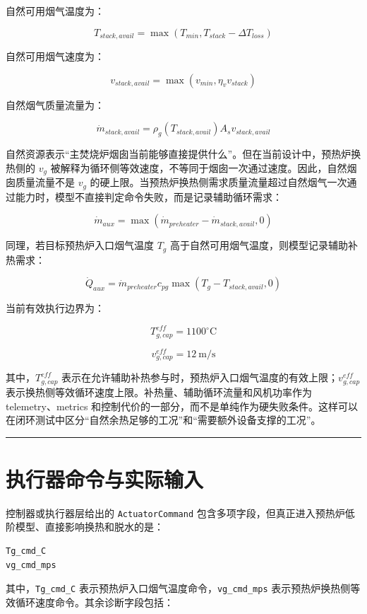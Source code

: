\documentclass[UTF8,openany,zihao=-4,oneside]{ctexbook}
\providecommand{\passthrough}[1]{#1}
\newcommand{\manualdivider}{\par\vspace{0.6em}\noindent\textcolor{FGLine}{\rule{\linewidth}{0.7pt}}\vspace{0.6em}\par}
\begin{document}
自然可用烟气温度为：

\[
T_{stack,avail}=\max(T_{min},T_{stack}-\Delta T_{loss})
\]

自然可用烟气速度为：

\[
v_{stack,avail}=\max(v_{min},\eta_vv_{stack})
\]

自然烟气质量流量为：

\[
\dot m_{stack,avail}
=
\rho_g(T_{stack,avail})A_sv_{stack,avail}
\]

自然资源表示“主焚烧炉烟囱当前能够直接提供什么”。但在当前设计中，预热炉换热侧的 \(v_g\) 被解释为循环侧等效速度，不等同于烟囱一次通过速度。因此，自然烟囱质量流量不是 \(v_g\) 的硬上限。当预热炉换热侧需求质量流量超过自然烟气一次通过能力时，模型不直接判定命令失败，而是记录辅助循环需求：

\[
\dot m_{aux}
=
\max(\dot m_{preheater}-\dot m_{stack,avail},0)
\]

同理，若目标预热炉入口烟气温度 \(T_g\) 高于自然可用烟气温度，则模型记录辅助补热需求：

\[
\dot Q_{aux}
=
\dot m_{preheater}c_{pg}\max(T_g-T_{stack,avail},0)
\]

当前有效执行边界为：

\[
T_{g,cap}^{eff}=1100^\circ\mathrm{C}
\]

\[
v_{g,cap}^{eff}=12\ \mathrm{m/s}
\]

其中，\(T_{g,cap}^{eff}\) 表示在允许辅助补热参与时，预热炉入口烟气温度的有效上限；\(v_{g,cap}^{eff}\) 表示换热侧等效循环速度上限。补热量、辅助循环流量和风机功率作为 telemetry、metrics 和控制代价的一部分，而不是单纯作为硬失败条件。这样可以在闭环测试中区分“自然余热足够的工况”和“需要额外设备支撑的工况”。

\manualdivider

\section{执行器命令与实际输入}\label{ux6267ux884cux5668ux547dux4ee4ux4e0eux5b9eux9645ux8f93ux5165}

控制器或执行器层给出的 \passthrough{\lstinline!ActuatorCommand!} 包含多项字段，但真正进入预热炉低阶模型、直接影响换热和脱水的是：

\begin{lstlisting}
Tg_cmd_C
vg_cmd_mps
\end{lstlisting}

其中，\passthrough{\lstinline!Tg_cmd_C!} 表示预热炉入口烟气温度命令，\passthrough{\lstinline!vg_cmd_mps!} 表示预热炉换热侧等效循环速度命令。其余诊断字段包括：
\end{document}
